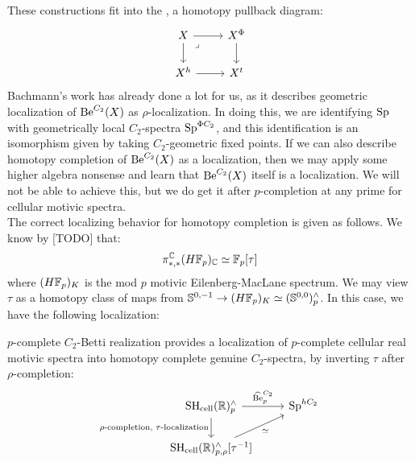 These constructions fit into the , a homotopy pullback diagram:
\[\begin{tikzcd}
	X & {X^\GeomFix} \\
	{X^h} & {X^t}
	\arrow[from=1-1, to=1-2]
	\arrow[from=1-1, to=2-1]
	\arrow["\lrcorner"{anchor=center, pos=0.125}, draw=none, from=1-1, to=2-2]
	\arrow[from=1-2, to=2-2]
	\arrow[from=2-1, to=2-2]
\end{tikzcd}\]
Bachmann's work has already done a lot for us, as it describes geometric localization of $ \mathrm{Be}^{C_2}(X) $ as $ \rho$-localization.
In doing this, we are identifying $ \mathrm{Sp} $ with geometrically local $ C_2 $-spectra $ \mathrm{Sp}^{\Phi C_2} $, and this identification is an isomorphism given by taking $ C_2 $-geometric fixed points.
If we can also describe homotopy completion of $ \mathrm{Be}^{C_2}(X) $ as a localization, then we may apply some higher algebra nonsense and learn that $ \mathrm{Be}^{C_2}(X) $ itself is a localization.
We will not be able to achieve this, but we do get it after $ p $-completion at any prime for cellular motivic spectra.
\\

The correct localizing behavior for homotopy completion is given as follows.
We know by [TODO] that:
$$ \pi_{\ast, \ast}^{\mathbb{C}} (H \mathbb{F}_p)_{\mathbb{C}} \simeq \mathbb{F}_p[\tau] $$
where $ (H \mathbb{F}_p)_K $ is the mod $ p $ motivic Eilenberg-MacLane spectrum.
We may view $ \tau $ as a homotopy class of maps from $ \mathbb{S}^{0, -1} \to (H \mathbb{F}_p)_K \simeq (\mathbb{S}^{0, 0})_p^{\wedge} $.
In this case, we have the following localization:
\begin{theorem}
$ p $-complete $ C_2 $-Betti realization provides a localization of $ p $-complete cellular real motivic spectra into homotopy complete genuine $ C_2 $-spectra, by inverting $ \tau $ after $ \rho $-completion:
\[\begin{tikzcd}
	{\SHRcell_p^{\wedge}} & {\Sp^{hC_2}} \\
	{\SHRcell_{p, \rho}^\wedge [\tau^{-1}]}
	\arrow["\pBeCt", from=1-1, to=1-2]
	\arrow["{\rho \text{-completion, } \tau\text{-localization}}"', from=1-1, to=2-1]
	\arrow["\isom"', from=2-1, to=1-2]
\end{tikzcd}\]
\end{theorem}
